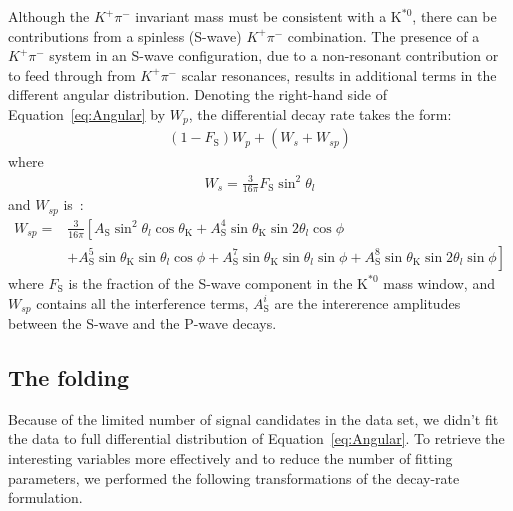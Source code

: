 Although the $K^+\pi^-$ invariant mass must be consistent with a $\text{K}^{*0}$, there can be contributions from a spinless (S-wave) $K^+\pi^-$ combination.
The presence of a $K^+\pi^-$ system in an S-wave configuration, due to a non-resonant contribution or to feed through from $K^+\pi^-$ scalar resonances, results in additional terms in the different angular distribution.
Denoting the right-hand side of Equation~\ref{eq:Angular} by $W_p$, the differential decay rate takes the form:
\begin{equation} \label{eq:S-wave}
  \begin{split}
    (1-F_\mathrm{S})W_p + (W_s + W_{sp})
  \end{split}
\end{equation}
where 
\begin{equation} \label{eq:S-wave0}
  \begin{split}
    W_s = \frac{3}{16\pi} F_\mathrm{S}\sin^2\theta_l
  \end{split}
\end{equation}
and $W_{sp}$ is~\cite{Genon:Swave}:
\begin{equation} \label{eq:S-wave1}
  \begin{split}
    W_{sp}= &\frac{3}{16 \pi}\left[ A_\mathrm{S}\sin^2\theta_l\cos\theta_\mathrm{K}+ A_\mathrm{S}^4\sin\theta_\mathrm{K}\sin2\theta_l\cos\phi\right.\\
      &+\left.A^5_\mathrm{S}\sin\theta_\mathrm{K}\sin\theta_l\cos\phi+A_\mathrm{S}^7\sin\theta_\mathrm{K}\sin\theta_l\sin\phi+A_\mathrm{S}^8\sin\theta_\mathrm{K}\sin2\theta_l\sin\phi\right]
  \end{split}
\end{equation}
where $F_\mathrm{S}$ is the fraction of the S-wave component in the $\text{K}^{*0}$ mass window, and $W_{sp}$ contains all the interference terms, $A_\mathrm{S}^i$ are the intererence amplitudes between the S-wave and the P-wave decays\cite{Genon:Swave}.

\subsection{The \pdf folding}
\label{sec:folding}

Because of the limited number of signal candidates in the data set, we didn't fit the data to full differential distribution of Equation~\ref{eq:Angular}.
To retrieve the interesting variables more effectively and to reduce the number of fitting parameters, we performed the following transformations of the decay-rate formulation.

